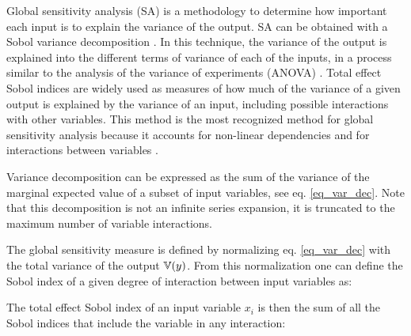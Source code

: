 \documentclass[preprint,12pt]{elsarticle}
\begin{document}
Global sensitivity analysis (SA) is a methodology to determine how important each input is to explain the variance of the output. SA can be obtained with a Sobol variance decomposition \cite{sobol2001global}. In this technique, the variance of the output is explained into the different terms of variance of each of the inputs, in a process similar to the analysis of the variance of experiments (ANOVA) \cite{maxwell2004designing}. Total effect Sobol indices are widely used as measures of how much of the variance of a given output is explained by the variance of an input, including possible interactions with other variables. This method is the most recognized method for global sensitivity analysis because it accounts for non-linear dependencies and for interactions between variables \cite{saltelli2010variance}.

Variance decomposition can be expressed as the sum of the variance of the marginal expected value of a subset of input variables, see eq. \ref{eq_var_dec}. Note that this decomposition is not an infinite series expansion, it is truncated to the maximum number of variable interactions.


The global sensitivity measure is defined by normalizing eq. \ref{eq_var_dec} with the total variance of the output $\mathbb{V}(y)$. From this normalization one can define the Sobol index of a given degree of interaction between input variables as:


The total effect Sobol index of an input variable $x_i$ is then the sum of all the Sobol indices that include the variable in any interaction:
\end{document}
